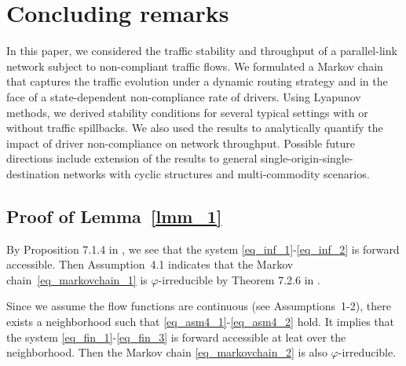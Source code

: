\section{Concluding remarks}
\label{sec_conclusion}

In this paper, we considered the traffic stability and throughput of a parallel-link network subject to non-compliant traffic flows. We formulated a Markov chain that captures the traffic evolution under a dynamic routing strategy and in the face of a state-dependent non-compliance rate of drivers. Using Lyapunov methods, we derived stability conditions for several typical settings with or without traffic spillbacks. We also used the results to analytically quantify the impact of driver non-compliance on network throughput.
Possible future directions include extension of the results to general single-origin-single-destination networks with cyclic structures and multi-commodity scenarios.


\appendix
\subsection{Proof of Lemma~\ref{lmm_1}}
\label{app_pf_lmm1}

By Proposition 7.1.4 in  \cite{meyn2012markov}, we see that the system \eqref{eq_inf_1}-\eqref{eq_inf_2} is forward accessible. Then Assumption~4.1 indicates that the Markov chain~\eqref{eq_markovchain_1} is $\varphi$-irreducible by Theorem 7.2.6 in \cite{meyn2012markov}. 

Since we assume the flow functions are continuous (see Assumptions~1-2), there exists a neighborhood such that \eqref{eq_asm4_1}-\eqref{eq_asm4_2} hold. It implies that the system \eqref{eq_fin_1}-\eqref{eq_fin_3} is forward accessible at leat over the neighborhood. Then the Markov chain \eqref{eq_markovchain_2} is also $\varphi$-irreducible.